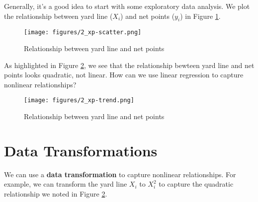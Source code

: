 \documentclass[twoside]{article}
\theoremstyle{definition}
\begin{document}
Generally, it's a good idea to start with some exploratory data analysis. We plot the relationship between yard line ($X_i$) and net points ($y_i$) in Figure \ref{fig:xp-scatter}.
\begin{figure}[H]
    \centering
    \texttt{[image: figures/2\_xp-scatter.png]}
    \caption{Relationship between yard line and net points}
    \label{fig:xp-scatter}
\end{figure}
As highlighted in Figure \ref{fig:xp-trend}, we see that the relationship bewteen yard line and net points looks quadratic, not linear. How can we use linear regression to capture nonlinear relationships?
\begin{figure}[H]
    \centering
    \texttt{[image: figures/2\_xp-trend.png]}
    \caption{Relationship between yard line and net points}
    \label{fig:xp-trend}
\end{figure}

\section{Data Transformations}

We can use a \textbf{data transformation} to capture nonlinear relationships. For example, we can transform the yard line $X_i$ to $X_i^2$ to capture the quadratic relationship we noted in Figure \ref{fig:xp-trend}.
\end{document}
